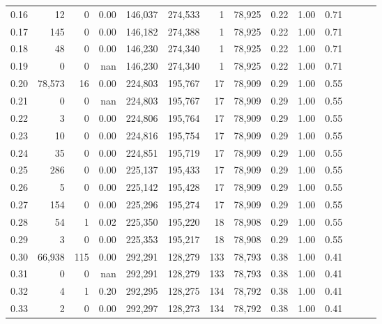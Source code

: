 \begin{tabular}{rrrrrrrrrrrrrr}
0.16 &      12 &       0 &  0.00 &  146,037 &  274,533 &       1 &  78,925 &  0.22 &  1.00 &      0.71 \\
0.17 &     145 &       0 &  0.00 &  146,182 &  274,388 &       1 &  78,925 &  0.22 &  1.00 &      0.71 \\
0.18 &      48 &       0 &  0.00 &  146,230 &  274,340 &       1 &  78,925 &  0.22 &  1.00 &      0.71 \\
0.19 &       0 &       0 &   nan &  146,230 &  274,340 &       1 &  78,925 &  0.22 &  1.00 &      0.71 \\
0.20 &  78,573 &      16 &  0.00 &  224,803 &  195,767 &      17 &  78,909 &  0.29 &  1.00 &      0.55 \\
0.21 &       0 &       0 &   nan &  224,803 &  195,767 &      17 &  78,909 &  0.29 &  1.00 &      0.55 \\
0.22 &       3 &       0 &  0.00 &  224,806 &  195,764 &      17 &  78,909 &  0.29 &  1.00 &      0.55 \\
0.23 &      10 &       0 &  0.00 &  224,816 &  195,754 &      17 &  78,909 &  0.29 &  1.00 &      0.55 \\
0.24 &      35 &       0 &  0.00 &  224,851 &  195,719 &      17 &  78,909 &  0.29 &  1.00 &      0.55 \\
0.25 &     286 &       0 &  0.00 &  225,137 &  195,433 &      17 &  78,909 &  0.29 &  1.00 &      0.55 \\
0.26 &       5 &       0 &  0.00 &  225,142 &  195,428 &      17 &  78,909 &  0.29 &  1.00 &      0.55 \\
0.27 &     154 &       0 &  0.00 &  225,296 &  195,274 &      17 &  78,909 &  0.29 &  1.00 &      0.55 \\
0.28 &      54 &       1 &  0.02 &  225,350 &  195,220 &      18 &  78,908 &  0.29 &  1.00 &      0.55 \\
0.29 &       3 &       0 &  0.00 &  225,353 &  195,217 &      18 &  78,908 &  0.29 &  1.00 &      0.55 \\
0.30 &  66,938 &     115 &  0.00 &  292,291 &  128,279 &     133 &  78,793 &  0.38 &  1.00 &      0.41 \\
0.31 &       0 &       0 &   nan &  292,291 &  128,279 &     133 &  78,793 &  0.38 &  1.00 &      0.41 \\
0.32 &       4 &       1 &  0.20 &  292,295 &  128,275 &     134 &  78,792 &  0.38 &  1.00 &      0.41 \\
0.33 &       2 &       0 &  0.00 &  292,297 &  128,273 &     134 &  78,792 &  0.38 &  1.00 &      0.41 \\

\end{tabular}
